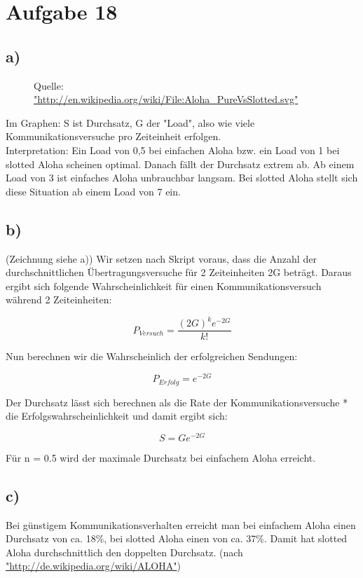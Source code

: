 \documentclass[a4paper,12pt]{scrartcl}
\begin{document}
\section{Aufgabe 18}

\subsection{a)}
\begin{figure}[h]
	
	\caption{Quelle: \url{"http://en.wikipedia.org/wiki/File:Aloha_PureVsSlotted.svg"}}
\end{figure}
Im Graphen: S ist Durchsatz, G der "Load", also wie viele Kommunikationsversuche
pro Zeiteinheit erfolgen.\\
Interpretation: Ein Load von 0,5 bei einfachen Aloha bzw. ein Load von 1 bei
slotted Aloha scheinen optimal. Danach fällt der Durchsatz extrem ab. Ab einem
Load von 3 ist einfaches Aloha unbrauchbar langsam. Bei slotted Aloha stellt
sich diese Situation ab einem Load von 7 ein.

\subsection{b)}
(Zeichnung siehe a))
Wir setzen nach Skript voraus, dass die Anzahl der durchschnittlichen
Übertragungsversuche für 2 Zeiteinheiten 2G beträgt. Daraus ergibt sich folgende
Wahrscheinlichkeit für einen Kommunikationsversuch während 2 Zeiteinheiten:

\[P_{Versuch} = \frac {(2G)^ke^{-2G}} {k!}\]

Nun berechnen wir die Wahrscheinlich der erfolgreichen Sendungen:

\[P_{Erfolg} = e^{-2G}\]

Der Durchsatz lässt sich berechnen als die Rate der Kommunikationsversuche *
die Erfolgswahrscheinlichkeit und damit ergibt sich:

\[S = Ge^{-2G}\]

Für n = 0.5 wird der maximale Durchsatz bei einfachem Aloha erreicht.

\subsection{c)}
Bei günstigem Kommunikationsverhalten erreicht man bei einfachem Aloha einen
Durchsatz von ca. 18\%, bei slotted Aloha einen von ca. 37\%. Damit hat
slotted Aloha durchschnittlich den doppelten Durchsatz.
(nach \url{"http://de.wikipedia.org/wiki/ALOHA"})
\end{document}
